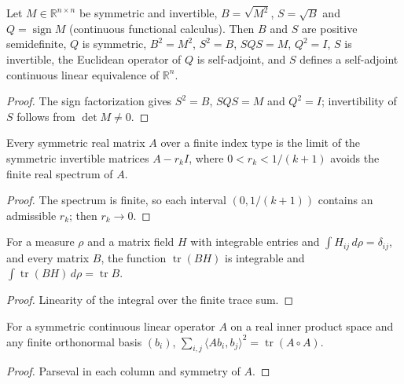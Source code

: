 \begin{lemma}
  \label{lem:symmetric-matrix-spectral-geometry}
  \leanok
  Let $M\in\mathbb R^{n\times n}$ be symmetric and invertible, $B=\sqrt{M^2}$, $S=\sqrt B$ and $Q=\operatorname{sign}M$
  (continuous functional calculus). Then $B$ and $S$ are positive semidefinite, $Q$ is symmetric, $B^2=M^2$, $S^2=B$,
  $SQS=M$, $Q^2=I$, $S$ is invertible, the Euclidean operator of $Q$ is self-adjoint, and $S$ defines a self-adjoint
  continuous linear equivalence of $\mathbb R^n$.
\end{lemma}
\begin{proof}
  \leanok
  The sign factorization gives $S^2=B$, $SQS=M$ and $Q^2=I$; invertibility of $S$ follows from $\det M\ne0$.
\end{proof}

\begin{lemma}
  \label{lem:symmetric-invertible-approximation}
  \leanok
  Every symmetric real matrix $A$ over a finite index type is the limit of the symmetric invertible matrices
  $A-r_kI$, where $0<r_k<1/(k+1)$ avoids the finite real spectrum of $A$.
\end{lemma}
\begin{proof}
  \leanok
  The spectrum is finite, so each interval $(0,1/(k+1))$ contains an admissible $r_k$; then $r_k\to0$.
\end{proof}

\begin{lemma}
  \label{lem:matrix-trace-mean-identity}
  \leanok
  For a measure $\rho$ and a matrix field $H$ with integrable entries and $\int H_{ij}\,d\rho=\delta_{ij}$, and every
  matrix $B$, the function $\operatorname{tr}(BH)$ is integrable and $\int\operatorname{tr}(BH)\,d\rho=\operatorname{tr}B$.
\end{lemma}
\begin{proof}
  \leanok
  Linearity of the integral over the finite trace sum.
\end{proof}

\begin{lemma}
  \label{lem:symmetric-hilbert-schmidt-trace}
  \leanok
  For a symmetric continuous linear operator $A$ on a real inner product space and any finite orthonormal basis $(b_i)$,
  $\sum_{i,j}\langle Ab_i,b_j\rangle^2=\operatorname{tr}(A\circ A)$.
\end{lemma}
\begin{proof}
  \leanok
  Parseval in each column and symmetry of $A$.
\end{proof}

